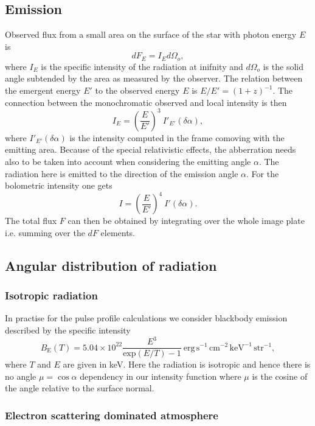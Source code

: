 \documentclass[iop, usenatbib]{emulateapj}
\newcommand{\be}{\begin{equation}}
\newcommand{\ee}{\end{equation}}
\begin{document}
\subsection{Emission}
Observed flux from a small area on the surface of the star with photon energy $E$ is
\be
dF_E = I_E d\Omega_o,
\ee
where $I_E$ is the specific intensity of the radiation at inifnity and $d\Omega_o$ is the solid angle subtended by the area as measured by the observer.
The relation between the emergent energy $E'$ to the observed energy $E$ is $E/E' = (1 + z)^{-1}$.
The connection between the monochromatic observed and local intensity is then \citep[see e.g.,][]{MTW73, RL79}
\be
I_E = \left( \frac{E}{E'} \right)^3 ~I'_{E'}(\delta \alpha),
\ee
where $I'_{E'}(\delta \alpha)$ is the intensity computed in the frame comoving with the emitting area.
Because of the special relativistic effects, the abberration needs also to be taken into account when considering the emitting angle $\alpha$.
The radiation here is emitted to the direction of the emission angle $\alpha$.
For the bolometric intensity one gets
\be
I = \left(\frac{E}{E'} \right)^4 ~I'(\delta \alpha).
\ee
The total flux $F$ can then be obtained by integrating over the whole image plate i.e. summing over the $dF$ elements.

\subsection{Angular distribution of radiation}
\subsubsection{Isotropic radiation}

In practise for the pulse profile calculations we consider blackbody emission described by the specific intensity
\begin{equation}
  B_{\mathrm{E}}(T) = 5.04 \times 10^{22} \frac{E^3}{\mathrm{exp}(E/T) -1}~\mathrm{erg}\,\mathrm{s}^{-1}\,\mathrm{cm}^{-2}\,\mathrm{keV}^{-1}\,\mathrm{str}^{-1},
\end{equation}
where $T$ and $E$ are given in keV.
Here the radiation is isotropic and hence there is no angle $\mu = \cos\alpha$ dependency in our intensity function where $\mu$ is the cosine of the angle relative to the surface normal.

\subsubsection{Electron scattering dominated atmosphere}
\end{document}
